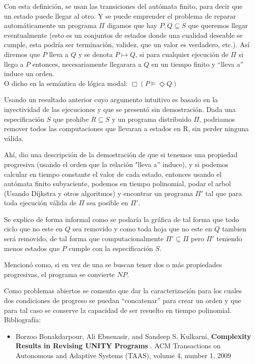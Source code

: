\documentclass{article}
\begin{document}
\begin{enumerate}
Con esta definición, se usan las transiciones del autómata finito, para decir que un estado puede llegar al otro. Y se puede emprender el problema de reparar automáticamente un programa $\Pi$ digamos que hay  $P,Q \subseteq S$ que queremos llegar eventualmente (esto es un conjuntos de estados donde una cualidad deseable se cumple, esta podría ser terminación, validez, que un valor es verdadero, etc.). Así diremos que $P$ lleva a $Q$ y se denota $P \mapsto Q$, si para cualquier ejecución de $\Pi$ si llego a $P$ entonces, necesariamente llegarara a $Q$ en un tiempo finito y ``lleva a'' induce un orden.\\

O dicho en la semántica de lógica modal:  $ \Box (P \models \Diamond Q)  $

Usando un resultado anterior cuyo argumento intuitivo es basado en la inyectividad de las ejecuciones y que se presentó sin demostración. Dada una especificación $S$ que prohibe $R \subseteq S$ y un programa distribuido $\Pi$, podriamos remover todos las computaciones que llevaran a estados en R, sin perder ninguna válida.

Ahí, dio una descripción de la demostración de que si tenemos una propiedad progresiva (usando el orden que la relación "lleva a'' induce), y si podemos calcular en tiempo constante el valor de cada estado, entonces usando el autómata finito subyaciente, podemos en tiempo polinomial, podar el arbol (Usando Dijkstra y otros algoritmos) y  encontrar un programa $\Pi'$ tal que para toda ejecución válida de $\Pi$ sea posible en $\Pi'$.

Se explico de forma informal como se podaría la gráfica de tal forma que todo ciclo que no este en $Q$ sea removido y como toda hoja que no este en $Q$ tambien será removido, de tal forma que computacionalmente $\Pi' \subseteq \Pi$ pero $\Pi'$ teniendo menos estados que $P$ cumple con la especificación $S$.

Mencionó como, si en vez de una se buscan tener dos o más propiedades progresivas, el programa se convierte $NP$.

Como problemas abiertos se comento que dar la caracterización para los cuales dos condiciones de progreso se puedan ``concatenar'' para crear un orden y que para tal caso se conserve la capacidad de ser resuelto en tiempo polinomial.\\


Bibliografía:

\begin{itemize}
\item Borzoo Bonakdarpour, Ali Ebnenasir, and Sandeep S. Kulkarni, {\bf Complexity Results in Revising UNITY Programs }. ACM Transactions on Autonomous and Adaptive Systems (TAAS), volume 4, number 1, 2009


\end{itemize}
\end{enumerate}
\end{document}
